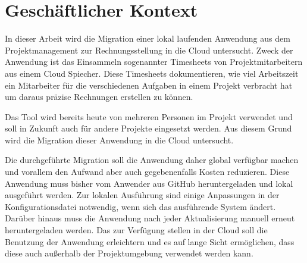 \section{Geschäftlicher Kontext}

In dieser Arbeit wird die Migration einer lokal laufenden Anwendung aus dem Projektmanagement zur Rechnungsstellung in die Cloud untersucht.
Zweck der Anwendung ist das Einsammeln sogenannter Timesheets von Projektmitarbeitern aus einem Cloud Spiecher. Diese Timesheets dokumentieren,
wie viel Arbeitszeit ein Mitarbeiter für die verschiedenen Aufgaben in einem Projekt verbracht hat um daraus präzise Rechnungen erstellen zu können.

Das Tool wird bereits heute von mehreren Personen im Projekt verwendet und soll in Zukunft auch für andere Projekte eingesetzt werden. Aus diesem
Grund wird die Migration dieser Anwendung in die Cloud untersucht.

Die durchgeführte Migration soll die Anwendung daher global verfügbar machen und vorallem den Aufwand aber auch gegebenenfalls Kosten reduzieren.
Diese Anwendung muss bisher vom Anwender aus GitHub heruntergeladen und lokal ausgeführt werden.
Zur lokalen Ausführung sind einige Anpassungen in der Konfigurationsdatei notwendig, wenn sich das ausführende System ändert.
Darüber hinaus muss die Anwendung nach jeder Aktualisierung manuell erneut heruntergeladen werden.
Das zur Verfügung stellen in der Cloud soll die Benutzung der Anwendung erleichtern und es auf lange Sicht ermöglichen, dass diese auch außerhalb der Projektumgebung verwendet werden kann.
